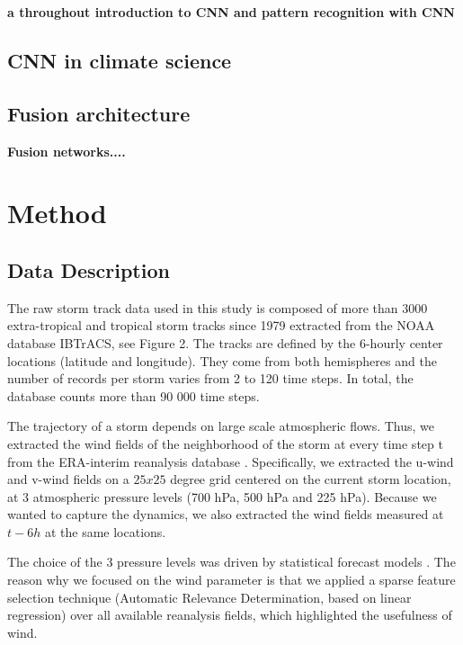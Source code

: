 \textbf{a throughout introduction to CNN and pattern recognition with CNN}


\section{CNN in climate science}

\section{Fusion architecture}
\textbf{Fusion networks....}



\chapter{Method}

\section{Data Description}
The raw storm track data used in this study is composed of more than 3000 extra-tropical and tropical storm tracks since 1979 extracted from the NOAA database IBTrACS\cite{knapp2010international}, see Figure 2. The tracks are defined by the 6-hourly center locations (latitude and longitude). They come from both hemispheres and the number of records per storm varies from 2 to 120 time steps. In total, the database counts more than 90 000 time steps. 

The trajectory of a storm depends on large scale atmospheric flows. Thus, we extracted the wind fields of the neighborhood of the storm at every time step t from the ERA-interim reanalysis database \cite{dee2011era}. Specifically, we extracted the u-wind and v-wind fields on a $25x25$ degree grid centered on the current storm location, at 3 atmospheric pressure levels (700 hPa, 500 hPa and 225 hPa). Because we wanted to capture the dynamics, we also extracted the wind fields measured at $t - 6h$ at the same locations.

The choice of the 3 pressure levels was driven by statistical forecast models \cite{demaria2005further}. The reason why we focused on the wind parameter is that we applied a sparse feature selection technique (Automatic Relevance Determination, based on linear regression) over all available reanalysis fields, which highlighted the usefulness of wind.


